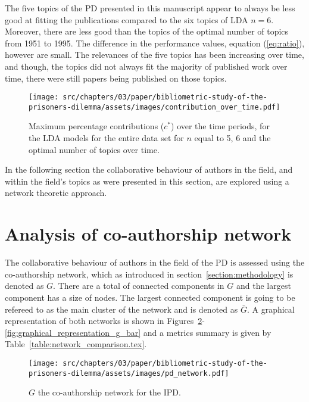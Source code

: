 The five topics of the PD presented in this manuscript appear to always be
less good at fitting the publications compared to the six topics of LDA \(n=6\).
Moreover, there are less good than the topics of the optimal number of topics
from 1951 to 1995. The difference in the performance values, equation (\ref{eq:ratio}),
however are small. The relevances of the five topics has been increasing
over time, and though, the topics did not always fit the majority of published
work over time, there were still papers being published on those topics.

\begin{figure}[!hbtp]
    \centering
    \texttt{[image: src/chapters/03/paper/bibliometric-study-of-the-prisoners-dilemma/assets/images/contribution\_over\_time.pdf]}
    \caption{Maximum percentage contributions (\(c^*\)) over the time periods,
    for the LDA models for the entire data set for \(n\) equal to 5, 6
    and the optimal number of topics over time.}
    \label{fig:median_percentage_contribution_over_time}
\end{figure}

In the following section the collaborative behaviour of authors in the field,
and within the field's topics as were presented in this section, are explored
using a network theoretic approach.

\section{Analysis of co-authorship network}\label{section:co_authorship}

The collaborative behaviour of authors in the field of the PD is assessed using
the co-authorship network, which as introduced in
section~\ref{section:methodology} is denoted as \(G\). There are a total of
\connectedcomponents connected components in \(G\) and the largest component has
a size of \largestcc nodes. The largest connected component is going to be
refereed to as the main cluster of the network and is denoted as \(\bar{G}\). A
graphical representation of both networks is shown in
Figures~\ref{fig:graphical_representation_g}-\ref{fig:graphical_representation_g_bar}
and a metrics summary is given by Table~\ref{table:network_comparison.tex}.

\begin{figure}[!hbtp]
    \texttt{[image: src/chapters/03/paper/bibliometric-study-of-the-prisoners-dilemma/assets/images/pd\_network.pdf]}
    \caption{\(G\) the co-authorship network for the IPD.}\label{fig:graphical_representation_g}
\end{figure}

